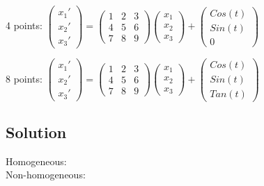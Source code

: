 4 points:
$\displaystyle
\left(
    \begin{array}{c}
        x_1' \\
        x_2' \\
        x_3'
    \end{array}
\right)
=
\left(
    \begin{array}{ccc}
        1 & 2 & 3 \\
        4 & 5 & 6 \\
        7 & 8 & 9
    \end{array}
\right)
\left(
    \begin{array}{c}
        x_1 \\
        x_2 \\
        x_3
    \end{array}
\right)
+
\left(
    \begin{array}{c}
        Cos(t) \\
        Sin(t) \\
        0
    \end{array}
\right)$

8 points:
$\displaystyle
\left(
    \begin{array}{c}
        x_1' \\
        x_2' \\
        x_3'
    \end{array}
\right)
=
\left(
    \begin{array}{ccc}
        1 & 2 & 3 \\
        4 & 5 & 6 \\
        7 & 8 & 9
    \end{array}
\right)
\left(
    \begin{array}{c}
        x_1 \\
        x_2 \\
        x_3
    \end{array}
\right)
+
\left(
    \begin{array}{c}
        Cos(t) \\
        Sin(t) \\
        Tan(t)
    \end{array}
\right)$

\subsection*{Solution}
Homogeneous:  \\
Non-homogeneous: 




